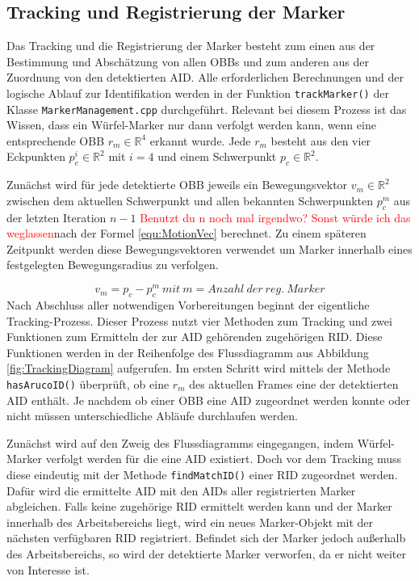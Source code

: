 \subsection{Tracking und Registrierung der Marker}\label{sec:trackAndReg}
Das Tracking und die Registrierung der Marker besteht zum einen aus der Bestimmung und Abschätzung von allen OBBs und zum anderen aus der Zuordnung von den detektierten AID. Alle erforderlichen Berechnungen und der logische Ablauf zur Identifikation werden in der Funktion \texttt{track\-Marker()} der Klasse \texttt{Marker\-Management.cpp} durchgeführt. Relevant bei diesem Prozess ist das Wissen, dass ein Würfel-Marker nur dann verfolgt werden kann, wenn eine entsprechende OBB $r_m \in \mathbb{R}^4$ erkannt wurde. Jede $r_m$ besteht aus den vier Eckpunkten $p_e^i \in \mathbb{R}^2$ mit $i=4$ und einem Schwerpunkt $p_c \in \mathbb{R}^2$.

Zunächst wird für jede detektierte OBB jeweils ein Bewegungsvektor $v_m \in \mathbb{R}^2$ zwischen dem aktuellen Schwerpunkt und allen bekannten Schwerpunkten $p_c^{m}$ aus der letzten Iteration $n-1$ \textcolor{red}{Benutzt du n noch mal irgendwo? Sonst würde ich das weglassen}nach der Formel \ref{equ:MotionVec} berechnet. Zu einem späteren Zeitpunkt werden diese Bewegungsvektoren verwendet um Marker innerhalb eines festgelegten Bewegungsradius zu verfolgen. 

\begin{equation}
\label{equ:MotionVec}
v_m = p_c - p_c^m \ mit \ m= Anzahl \ der \ reg. \ Marker
\end{equation}
Nach Abschluss aller notwendigen Vorbereitungen beginnt der eigentliche Tracking-Prozess. Dieser Prozess nutzt vier Methoden zum Tracking und zwei Funktionen zum Ermitteln der zur AID gehörenden zugehörigen RID. Diese Funktionen werden in der Reihenfolge des Flussdiagramm aus Abbildung \ref{fig:TrackingDiagram} aufgerufen. Im ersten Schritt wird mittels der Methode \texttt{has\-Aruco\-ID()} überprüft, ob eine $r_m$ des aktuellen Frames eine der detektierten AID enthält. Je nachdem ob einer OBB eine AID zugeordnet werden konnte oder nicht müssen unterschiedliche Abläufe durchlaufen werden.

Zunächst wird auf den Zweig des Flussdiagramms eingegangen, indem Würfel-Marker verfolgt werden für die eine AID existiert. Doch vor dem Tracking muss diese eindeutig mit der Methode \texttt{find\-Match\-ID()} einer RID zugeordnet werden. Dafür wird die ermittelte AID mit den AIDs aller registrierten Marker abgleichen. Falls keine zugehörige RID ermittelt werden kann und der Marker innerhalb des Arbeitsbereichs liegt, wird ein neues Marker-Objekt mit der nächsten verfügbaren RID registriert. Befindet sich der Marker jedoch außerhalb des Arbeitsbereichs, so wird der detektierte Marker verworfen, da er nicht weiter von Interesse ist.


